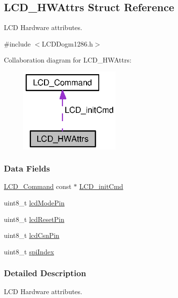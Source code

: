 \subsection{L\+C\+D\+\_\+\+H\+W\+Attrs Struct Reference}
\label{struct_l_c_d___h_w_attrs}


L\+C\+D Hardware attributes.  




{\ttfamily \#include $<$L\+C\+D\+Dogm1286.\+h$>$}



Collaboration diagram for L\+C\+D\+\_\+\+H\+W\+Attrs\+:
\nopagebreak
\begin{figure}[H]
\begin{center}
\leavevmode
\includegraphics[width=143pt]{struct_l_c_d___h_w_attrs__coll__graph}
\end{center}
\end{figure}
\subsubsection*{Data Fields}
\begin{DoxyCompactItemize}
\item 
\hyperlink{struct_l_c_d___command}{L\+C\+D\+\_\+\+Command} const $\ast$ \hyperlink{struct_l_c_d___h_w_attrs_a04de8f9bfd92ed872bbd447177eba7a1}{L\+C\+D\+\_\+init\+Cmd}
\item 
uint8\+\_\+t \hyperlink{struct_l_c_d___h_w_attrs_af2b2c62d70137e4f8727136001e69718}{lcd\+Mode\+Pin}
\item 
uint8\+\_\+t \hyperlink{struct_l_c_d___h_w_attrs_a5a9db2fc62d4c34511507e5843ff82a1}{lcd\+Reset\+Pin}
\item 
uint8\+\_\+t \hyperlink{struct_l_c_d___h_w_attrs_af9926a7b6972357506299ff4893a5ffc}{lcd\+Csn\+Pin}
\item 
uint8\+\_\+t \hyperlink{struct_l_c_d___h_w_attrs_aad817df3726cc746fd22075f4510e9d6}{spi\+Index}
\end{DoxyCompactItemize}


\subsubsection{Detailed Description}
L\+C\+D Hardware attributes. 


